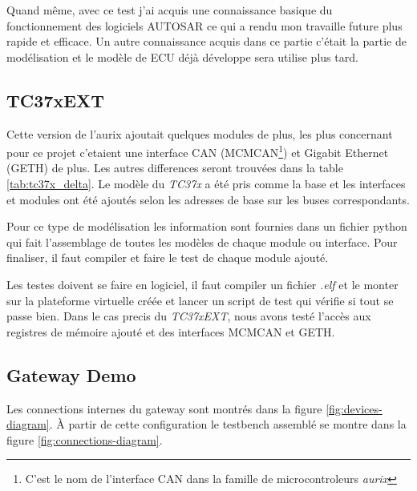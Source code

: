 Quand même, avec ce test j'ai acquis une connaissance basique du fonctionnement des logiciels AUTOSAR ce qui a rendu mon travaille future plus rapide et efficace. Un autre connaissance acquis dans ce partie c'était la partie de modélisation et le modèle de ECU déjà développe sera utilise plus tard.

\subsection{TC37xEXT}

Cette version de l'aurix ajoutait quelques modules de plus, les plus concernant pour ce projet c'etaient une interface CAN (MCMCAN\footnote{C'est le nom de l'interface CAN dans la famille de microcontroleurs \textit{aurix}}) et Gigabit Ethernet (GETH) de plus. Les autres differences seront trouv\'ees dans la table \ref{tab:tc37x_delta}. Le modèle du \textit{TC37x}\cite{aurix.tc37x} a \'et\'e pris comme la base et les interfaces et modules ont \'et\'e ajout\'es selon les adresses de base sur les buses correspondants.



Pour ce type de modélisation les information sont fournies dans un fichier python qui fait l'assemblage de toutes les modèles de chaque module ou interface. Pour finaliser, il faut compiler et faire le test de chaque module ajout\'e.

Les testes doivent se faire en logiciel, il faut compiler un fichier \textit{.elf} et le monter sur la plateforme virtuelle cr\'e\'ee et lancer un script de test qui vérifie si tout se passe bien. Dans le cas precis du \textit{TC37xEXT},  nous avons test\'e l'accès aux registres de mémoire ajout\'e et des interfaces MCMCAN et GETH.

\subsection{Gateway Demo}

Les connections internes du gateway sont montr\'es dans la figure \ref{fig:devices-diagram}. \`A partir de cette configuration le testbench assembl\'e se montre dans la figure \ref{fig:connections-diagram}. %

